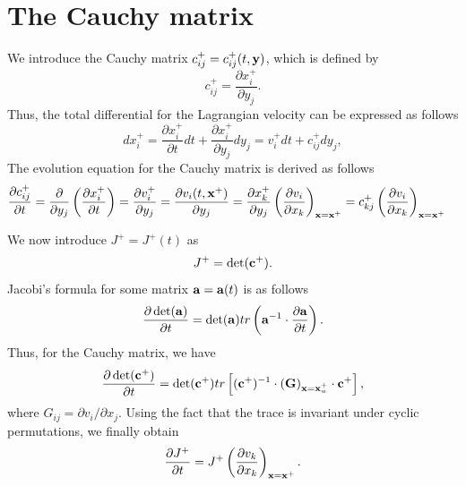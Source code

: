 \documentclass[oneside,a4paper,11pt]{report}
\begin{document}
\section{The Cauchy matrix}
We introduce the Cauchy matrix $c^+_{ij} = c^+_{ij}(t,\mathbf{y})$, which is defined by
\begin{equation}
    c^+_{ij} = \frac{\partial x^+_i}{\partial y_j}.
\end{equation}
Thus, the total differential for the Lagrangian velocity can be expressed as follows
\begin{equation}
dx^+_i = \frac{ \partial x^+_i}{\partial t} dt + \frac{\partial x^+_i}{\partial y_j}dy_j = v^+_i dt + c^+_{ij} dy_j,
\end{equation}
The evolution equation for the Cauchy matrix is derived as follows
\begin{align}
\label{eq:pde_of_cauchy_matrix}
\frac{\partial c^+_{ij}}{\partial t} & = \frac{\partial}{\partial y_j} \left ( \frac{\partial x^+_i}{\partial t} \right ) = \frac{\partial v^+_i}{\partial y_j} = \frac{\partial v_i(t,\mathbf{x}^+)}{\partial y_j} = \frac{\partial x^+_{k}}{\partial y_j} \left ( \frac{ \partial v_i}{\partial x_k} \right )_{\mathbf{x} = \mathbf{x}^+} = c^+_{kj} \left ( \frac{ \partial v_i}{\partial x_k} \right )_{\mathbf{x} = \mathbf{x}^+} 
\end{align}

We now introduce $J^+ = J^+(t)$ as
\begin{equation}
    J^+ = \det (\mathbf{c}^+).
\end{equation}
Jacobi's formula for some matrix $\mathbf{a} = \mathbf{a}(t)$ is as follows
\begin{equation}
    \frac{\partial \det( \mathbf{a} )}{\partial t} = \det( \mathbf{a} ) tr \left ( \mathbf{a}^{-1} \cdot \frac{\partial \mathbf{a}}{\partial t} \right ).
\end{equation}
Thus, for the Cauchy matrix, we have
\begin{equation}
    \frac{\partial \det(\mathbf{c}^+) }{\partial t} = \det( \mathbf{c}^+ ) tr \left [ (\mathbf{c}^+)^{-1} \cdot \left ( \mathbf{G} \right )_{\mathbf{x} = \mathbf{x}^+_u} \cdot \mathbf{c}^+ \right ],
\end{equation}
where $G_{ij} = \partial v_i / \partial x_j$. Using the fact that the trace is invariant under cyclic permutations, we finally obtain
\begin{equation}
    \label{eq:evolution_J}
    \frac{\partial J^+}{\partial t} = J^+ \left (\frac{\partial v_k}{\partial x_k} \right )_{\mathbf{x} = \mathbf{x}^+}.
\end{equation}
\end{document}

